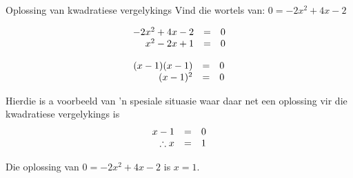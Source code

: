 \begin{wex}{Oplossing van kwadratiese vergelykings }
{ Vind die wortels van: $0=-2{x}^{2}+4x-2$}
{

\begin{equation*}
\begin{array}{ccc}\hfill -2{x}^{2}+4x-2& =& 0\hfill \\ \hfill {x}^{2}-2x+1& =& 0\hfill \end{array}
\end{equation*}


\begin{equation*}
\begin{array}{ccc} \hfill (x-1)(x-1) &=& 0 \hfill \\
\hfill (x-1)^{2} &=&0 \hfill 
\end{array}
\end{equation*}

Hierdie is a voorbeeld van 'n spesiale situasie waar daar net een oplossing vir die kwadratiese vergelykings is
\begin{equation*}
\begin{array}{ccc} \hfill x -1 &=& 0 \hfill \\
\hfill \therefore x &=&1 \hfill 
\end{array}
\end{equation*}


 
Die oplossing van $0=-2{x}^{2}+4x-2$ is $x=1$.
}
\end{wex}


